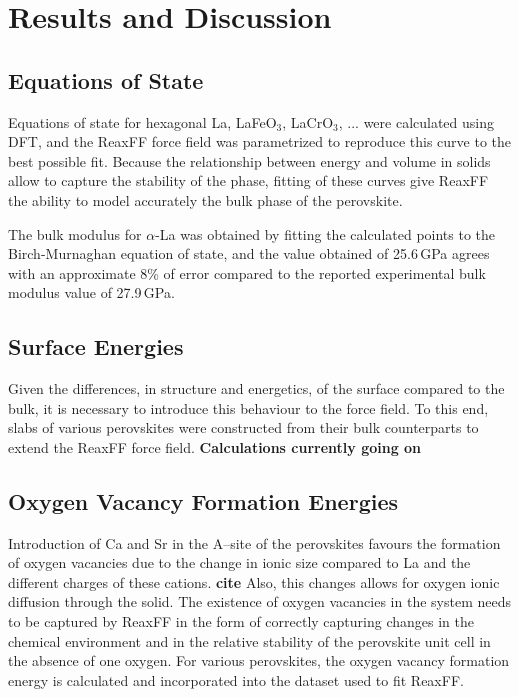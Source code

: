 \documentclass[journal=jpcafh,manuscript=article]{achemso}
\begin{document}
\section{Results and Discussion}

\subsection{Equations of State}

Equations of state for hexagonal La, LaFeO$_3$, LaCrO$_3$, ... were calculated using DFT, and the ReaxFF force field was parametrized to reproduce this curve to the best possible fit.
Because the relationship between energy and volume in solids allow to capture the stability of the phase, fitting of these curves give ReaxFF the ability to model accurately the bulk phase of the perovskite.

The bulk modulus for $\alpha$-La was obtained by fitting the calculated points to the Birch-Murnaghan equation of state\cite{fu_first-principles_1983}, and the value obtained of 25.6\,GPa agrees with an approximate 8\% of error compared to the reported experimental bulk modulus value of 27.9\,GPa.\cite{lide2003crc}

\subsection{Surface Energies}

Given the differences, in structure and energetics, of the surface compared to the bulk, it is necessary to introduce this behaviour to the force field.
To this end, slabs of various perovskites were constructed from their bulk counterparts to extend the ReaxFF force field.
\textbf{Calculations currently going on}

\subsection{Oxygen Vacancy Formation Energies}

Introduction of Ca and Sr in the A--site of the perovskites favours the formation of oxygen vacancies due to the change in ionic size compared to La and the different charges of these cations. \textbf{cite}
Also, this changes allows for oxygen ionic diffusion through the solid.
The existence of oxygen vacancies in the system needs to be captured by ReaxFF in the form of correctly capturing changes in the chemical environment and in the relative stability of the perovskite unit cell in the absence of one oxygen.
For various perovskites, the oxygen vacancy formation energy is calculated and incorporated into the dataset used to fit ReaxFF.
\end{document}
